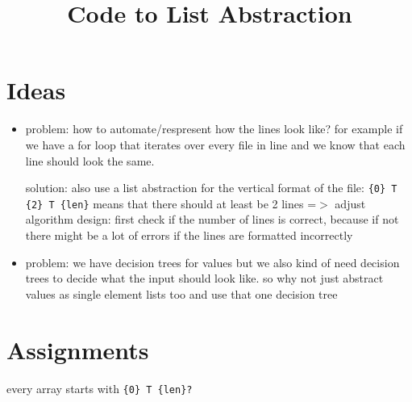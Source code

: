 \documentclass[11pt]{article}
\begin{document}
\title{Code to List Abstraction}

\maketitle


\section{Ideas}

\begin{itemize}
\item problem: how to automate/respresent how the lines look like? for example if we have a for loop that iterates over every file in line and we know that each line should look the same.

solution: also use a list abstraction for the vertical format of the file: \verb|{0} T {2} T {len}| means that there should at least be 2 lines =$>$ adjust algorithm design: first check if the number of lines is correct, because if not there might be a lot of errors if the lines are formatted incorrectly

\item problem: we have decision trees for values but we also kind of need decision trees to decide what the input should look like. so why not just abstract values as single element lists too and use that one decision tree
\end{itemize}

\section{Assignments}

every array starts with \verb|{0} T {len}?|
\end{document}
